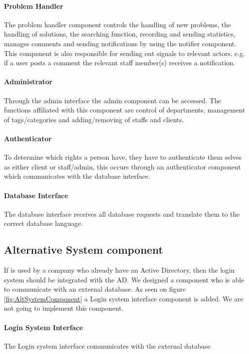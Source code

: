 \paragraph{Problem Handler}
The problem handler component controls the handling of new problems, the handling of solutions, the searching function, recording and sending statistics, manages comments and sending notifications by using the notifier component.
This component is also responsible for sending out signals to relevant actors. e.g. if a user posts a comment the relevant staff member(s) receives a notification.  

\paragraph{Administrator}
Through the admin interface the admin component can be accessed. The functions affiliated with this component are control of departments, management of tags/categories and adding/removing of staffs and clients.   

\paragraph{Authenticator}
To determine which rights a person have, they have to authenticate them selves as either client or staff/admin, this occurs through an authenticator component which communicates with the database interface. 
\paragraph{Database Interface}
The database interface receives all database requests and translate them to the correct database language.


\subsection{Alternative System component}
\label{sub:altSystemComponent}
 
If \hdesk[] is used by a company who already have an Active Directory, then the login system should be integrated with the AD. We designed a component who is able to communicate with an external database. As seen on figure \ref{fig:AltSystemComponent} a Login system interface component is added. We are not going to implement this component.

\paragraph{Login System Interface}
The Login system interface communicates with the external database



